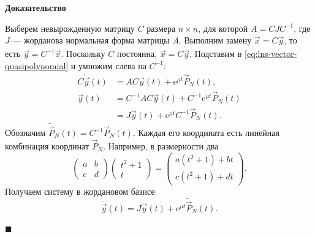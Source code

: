 \documentclass[12pt,a4paper]{article}
\numberwithin{equation}{section}
\newcommand{\vect}[1]{\vec{#1}}
\newcommand{\e}{\mathrm{e}}
\renewenvironment{proof}[1][Доказательство]{\begin{center}\textbf{#1}\end{center}}{\hfill$\blacksquare$\par}
\begin{document}
\begin{proof}
Выберем невырожденную матрицу \(C\) размера \(n\times n\), для которой
\(A=CJC^{-1}\), где \(J\) --- жорданова нормальная форма матрицы \(A\).
Выполним замену \(\vect x=C\vect y\), то есть \(\vect y=C^{-1}\vect x\).
Поскольку \(C\) постоянна, \(\dot{\vect x}=C\dot{\vect y}\).
Подставим в \eqref{eq:lns-vector-quasipolynomial} и умножим слева на \(C^{-1}\):
\[
\begin{aligned}
 C\dot{\vect y}(t)&=AC\vect y(t)+\e^{\mu t}\vect P_N(t),\\
 \dot{\vect y}(t)&=C^{-1}AC\vect y(t)+C^{-1}\e^{\mu t}\vect P_N(t)\\
 &=J\vect y(t)+\e^{\mu t}C^{-1}\vect P_N(t).
\end{aligned}
\]
Обозначим \(\widetilde{\vect P}_N(t)=C^{-1}\vect P_N(t)\).
Каждая его координата есть линейная комбинация координат \(\vect P_N\).
Например, в размерности два
\[
 \begin{pmatrix}a&b\\c&d\end{pmatrix}
 \begin{pmatrix}t^2+1\\t\end{pmatrix}
 =\begin{pmatrix}a(t^2+1)+bt\\c(t^2+1)+dt\end{pmatrix}.
\]
Получаем систему в жордановом базисе
\[
 \dot{\vect y}(t)=J\vect y(t)+\e^{\mu t}\widetilde{\vect P}_N(t).
\]


\end{proof}
\end{document}

